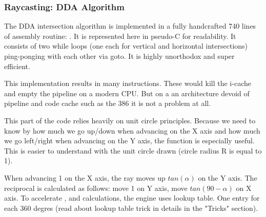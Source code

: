  
 
 
 
 
 
 
 
\subsubsection{Raycasting: DDA Algorithm}
The DDA intersection algorithm is implemented in a fully handcrafted 740 lines of assembly routine: . It is represented here in pseudo-C for readability. It consists of two while loops (one each for vertical and horizontal intersections) ping-ponging with each other via goto. It is highly unorthodox and super efficient.\\
\par



\begin{minipage}{\textwidth}

\end{minipage}
This implementation results in many  instructions. These would kill the i-cache and empty the pipeline on a modern CPU. But on a an architecture devoid of pipeline and code cache such as the 386 it is not a problem at all.\\
\par
This part of the code relies heavily on unit circle principles. Because we need to know by how much we go up/down when advancing on the X axis and how much we go left/right when advancing on the Y axis, the  function is especially useful. This is easier to understand with the unit circle drawn (circle radius R is equal to 1).
\begin{figure}[H]
\centering
 
\end{figure}
\par
When advancing 1 on the X axis, the ray moves up $tan(\alpha)$ on the Y axis. The reciprocal is calculated as follows: move 1 on Y axis, move $tan(90-\alpha)$ on X axis. To accelerate ,  and  calculations, the engine uses lookup table. One entry for each 360 degres (read about lookup table trick in details in the "Tricks" section).




















